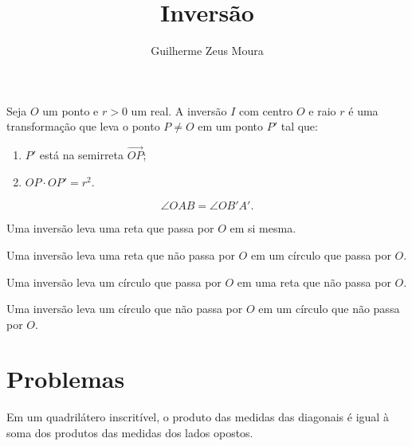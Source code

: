 \documentclass[10pt, a4paper]{article}
\title{Inversão}
\author{Guilherme Zeus Moura}
\begin{document}
	
	\zeustitle
	\begin{defn}[Inversão]
		Seja $O$ um ponto e $r > 0$ um real. A inversão $I$ com centro $O$ e raio $r$ é uma transformação que leva o ponto $P \neq O$ em um ponto $P'$ tal que:
		\begin{enumerate}[label = (\roman*)]
			\item $P'$ está na semirreta $\overrightarrow{OP}$;
			\item $OP \cdot OP' = r^2$.
		\end{enumerate}
	\end{defn}

	\begin{prop}
		\[ \angle OAB = \angle OB'A'. \]
	\end{prop}

	\begin{prop}
		Uma inversão leva uma reta que passa por $O$ em si mesma.
	\end{prop}

	\begin{prop}
		Uma inversão leva uma reta que não passa por $O$ em um círculo que passa por $O$.
	\end{prop}

	\begin{prop}
		Uma inversão leva um círculo que passa por $O$ em uma reta que não passa por $O$.
	\end{prop}

	\begin{prop}
		Uma inversão leva um círculo que não passa por $O$ em um círculo que não passa por $O$.
	\end{prop}

	\section*{Problemas}
	\begin{prob}
		Em um quadrilátero inscritível, o produto das medidas das diagonais é igual à soma dos produtos das medidas dos lados opostos.
	\end{prob}
\end{document}
